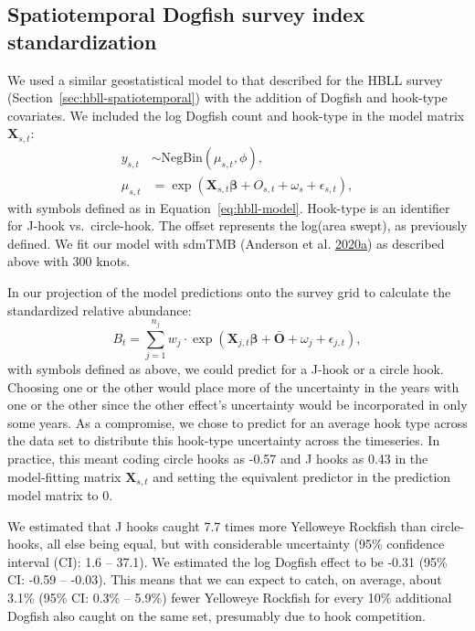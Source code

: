 \documentclass[11pt]{book}
\begin{document}
\hypertarget{sec:dog-index-model}{%
\subsection{Spatiotemporal Dogfish survey index standardization}\label{sec:dog-index-model}}

We used a similar geostatistical model to that described for the HBLL survey (Section~\ref{sec:hbll-spatiotemporal}) with the addition of Dogfish and hook-type covariates. We included the log Dogfish count and hook-type in the model matrix \(\bm{X}_{s,t}\):
\begin{align}
  y_{s,t} &\sim \mathrm{NegBin}(\mu_{s,t}, \phi),\\
  \mu_{s,t} &= \exp \left( \bm{X}_{s,t} \bm{\beta} + O_{s,t} + \omega_s + \epsilon_{s,t} \right),
\label{eq:dogfish-model}
\end{align}
with symbols defined as in Equation~\ref{eq:hbll-model}. Hook-type is an identifier for J-hook vs.~circle-hook. The offset represents the log(area swept), as previously defined. We fit our model with sdmTMB (Anderson et al. \protect\hyperlink{ref-sdmtmb}{2020}\protect\hyperlink{ref-sdmtmb}{a}) as described above with 300 knots.

In our projection of the model predictions onto the survey grid to calculate the standardized relative abundance:
\begin{equation}
B_t = \sum_{j = 1}^{n_j}
  w_j \cdot \exp \left( \bm{X}_{j,t} \bm{\beta} + \bar{\bm{O}} + \omega_j + \epsilon_{j,t} \right),
\label{eq:dog-prediction}
\end{equation}
with symbols defined as above, we could predict for a J-hook or a circle hook. Choosing one or the other would place more of the uncertainty in the years with one or the other since the other effect's uncertainty would be incorporated in only some years. As a compromise, we chose to predict for an average hook type across the data set to distribute this hook-type uncertainty across the timeseries. In practice, this meant coding circle hooks as -0.57 and J hooks as 0.43 in the model-fitting matrix \(\bm{X}_{s,t}\) and setting the equivalent predictor in the prediction model matrix to 0.

We estimated that J hooks caught 7.7 times more Yelloweye Rockfish than circle-hooks, all else being equal, but with considerable uncertainty (95\% confidence interval (CI): 1.6 -- 37.1). We estimated the log Dogfish effect to be -0.31 (95\% CI: -0.59 -- -0.03). This means that we can expect to catch, on average, about 3.1\% (95\% CI: 0.3\% -- 5.9\%) fewer Yelloweye Rockfish for every 10\% additional Dogfish also caught on the same set, presumably due to hook competition.
\end{document}
